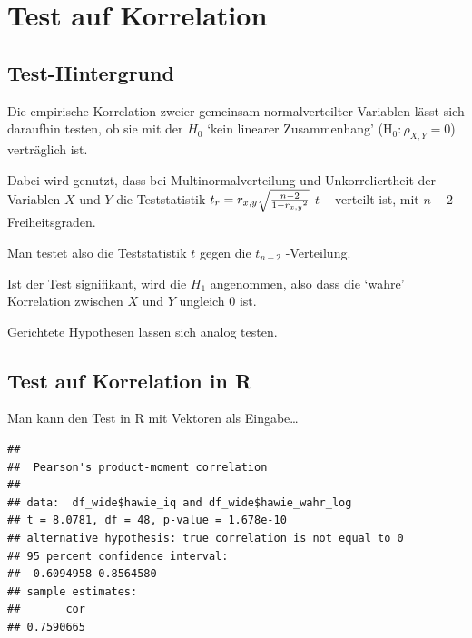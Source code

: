 \documentclass[
]{book}
\newenvironment{Shaded}{\begin{snugshade}}{\end{snugshade}}
\newcommand{\FunctionTok}[1]{\textcolor[rgb]{0.00,0.00,0.00}{#1}}
\newcommand{\NormalTok}[1]{#1}
\newcommand{\SpecialCharTok}[1]{\textcolor[rgb]{0.00,0.00,0.00}{#1}}
\begin{document}
\hypertarget{test-auf-korrelation}{%
\section{Test auf Korrelation}\label{test-auf-korrelation}}

\hypertarget{test-hintergrund}{%
\subsection{Test-Hintergrund}\label{test-hintergrund}}

Die empirische Korrelation zweier gemeinsam normalverteilter Variablen lässt sich daraufhin testen, ob sie
mit der \(H_0\) `kein linearer Zusammenhang' (\(\text{H}_{0}:\rho_{X,Y} = 0\)) verträglich ist.

Dabei wird genutzt, dass bei Multinormalverteilung und Unkorreliertheit der Variablen \(X\) und \(Y\) die Teststatistik \(t_r = r_{x,y} \sqrt{{n-2}\over{1-r_{x,y}}^2}\) \(t-\)verteilt ist, mit \(n-2\) Freiheitsgraden.

Man testet also die Teststatistik \(t\) gegen die \(t_{n-2}\) -Verteilung.

Ist der Test signifikant, wird die \(H_1\) angenommen, also dass die `wahre' Korrelation zwischen \(X\) und \(Y\) ungleich 0 ist.

Gerichtete Hypothesen lassen sich analog testen.

\hypertarget{test-auf-korrelation-in-r}{%
\subsection{Test auf Korrelation in R}\label{test-auf-korrelation-in-r}}

Man kann den Test in R mit Vektoren als Eingabe\ldots{}

\begin{Shaded}
\end{Shaded}

\begin{verbatim}
## 
##  Pearson's product-moment correlation
## 
## data:  df_wide$hawie_iq and df_wide$hawie_wahr_log
## t = 8.0781, df = 48, p-value = 1.678e-10
## alternative hypothesis: true correlation is not equal to 0
## 95 percent confidence interval:
##  0.6094958 0.8564580
## sample estimates:
##       cor 
## 0.7590665
\end{verbatim}
\end{document}
